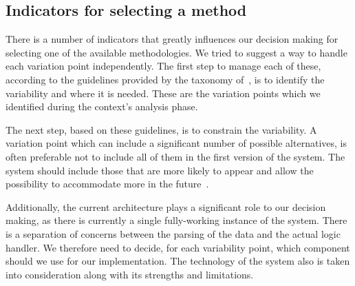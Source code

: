 %

\subsection{Indicators for selecting a method}\label{sec:indicators}

There is a number of indicators that greatly influences our decision making for selecting one of the available methodologies. We tried to suggest a way to handle each variation point independently. The first step to manage each of these, according to the guidelines provided by the taxonomy of~\cite{JillesVanGurp2001}, %
is to identify the variability and where it is needed. These are the variation points which we identified during the context's analysis phase. 

The next step, based on these guidelines, is to constrain the variability. A variation point which can include a significant number of possible alternatives, is often preferable not to include all of them in the first version of the system. The system should include those that are more likely to appear and allow the possibility to accommodate more in the future~\cite{JillesVanGurp2001}. %

Additionally, the current architecture plays a significant role to our decision making, as there is currently a single fully-working instance of the system. There is a separation of concerns between the parsing of the data and the actual logic handler. We therefore need to decide, for each variability point, which component should we use for our implementation. The technology of the system also is taken into consideration along with its strengths and limitations.

